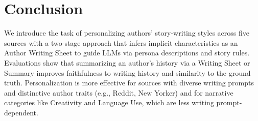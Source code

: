 
\section{Conclusion}
We introduce the task of personalizing authors' story-writing styles across five sources with a two-stage approach that infers implicit characteristics as an Author Writing Sheet to guide LLMs via persona descriptions and story rules. Evaluations show that summarizing an author’s history via a Writing Sheet or Summary improves faithfulness to writing history and similarity to the ground truth. Personalization is more effective for sources with diverse writing prompts and distinctive author traits (e.g., Reddit, New Yorker) and for narrative categories like Creativity and Language Use, which are less writing prompt-dependent.